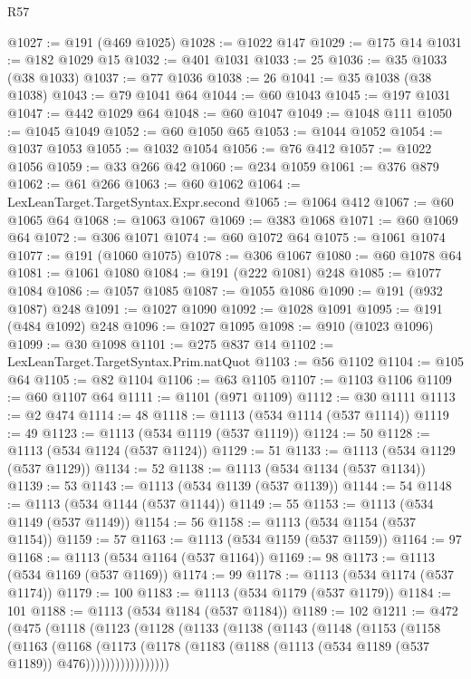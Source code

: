 \begin{lexlean}{R57}
\begin{coremodule}
@1027 := @191 (@469 @1025)
@1028 := @1022 @147
@1029 := @175 @14
@1031 := @182 @1029 @15
@1032 := @401 @1031
@1033 := 25
@1036 := @35 @1033 (@38 @1033)
@1037 := @77 @1036
@1038 := 26
@1041 := @35 @1038 (@38 @1038)
@1043 := @79 @1041 @64
@1044 := @60 @1043
@1045 := @197 @1031
@1047 := @442 @1029 @64
@1048 := @60 @1047
@1049 := @1048 @111
@1050 := @1045 @1049
@1052 := @60 @1050 @65
@1053 := @1044 @1052
@1054 := @1037 @1053
@1055 := @1032 @1054
@1056 := @76 @412
@1057 := @1022 @1056
@1059 := @33 @266 @42
@1060 := @234 @1059
@1061 := @376 @879
@1062 := @61 @266
@1063 := @60 @1062
@1064 := LexLeanTarget.TargetSyntax.Expr.second
@1065 := @1064 @412
@1067 := @60 @1065 @64
@1068 := @1063 @1067
@1069 := @383 @1068
@1071 := @60 @1069 @64
@1072 := @306 @1071
@1074 := @60 @1072 @64
@1075 := @1061 @1074
@1077 := @191 (@1060 @1075)
@1078 := @306 @1067
@1080 := @60 @1078 @64
@1081 := @1061 @1080
@1084 := @191 (@222 @1081) @248
@1085 := @1077 @1084
@1086 := @1057 @1085
@1087 := @1055 @1086
@1090 := @191 (@932 @1087) @248
@1091 := @1027 @1090
@1092 := @1028 @1091
@1095 := @191 (@484 @1092) @248
@1096 := @1027 @1095
@1098 := @910 (@1023 @1096)
@1099 := @30 @1098
@1101 := @275 @837 @14
@1102 := LexLeanTarget.TargetSyntax.Prim.natQuot
@1103 := @56 @1102
@1104 := @105 @64
@1105 := @82 @1104
@1106 := @63 @1105
@1107 := @1103 @1106
@1109 := @60 @1107 @64
@1111 := @1101 (@971 @1109)
@1112 := @30 @1111
@1113 := @2 @474
@1114 := 48
@1118 := @1113 (@534 @1114 (@537 @1114))
@1119 := 49
@1123 := @1113 (@534 @1119 (@537 @1119))
@1124 := 50
@1128 := @1113 (@534 @1124 (@537 @1124))
@1129 := 51
@1133 := @1113 (@534 @1129 (@537 @1129))
@1134 := 52
@1138 := @1113 (@534 @1134 (@537 @1134))
@1139 := 53
@1143 := @1113 (@534 @1139 (@537 @1139))
@1144 := 54
@1148 := @1113 (@534 @1144 (@537 @1144))
@1149 := 55
@1153 := @1113 (@534 @1149 (@537 @1149))
@1154 := 56
@1158 := @1113 (@534 @1154 (@537 @1154))
@1159 := 57
@1163 := @1113 (@534 @1159 (@537 @1159))
@1164 := 97
@1168 := @1113 (@534 @1164 (@537 @1164))
@1169 := 98
@1173 := @1113 (@534 @1169 (@537 @1169))
@1174 := 99
@1178 := @1113 (@534 @1174 (@537 @1174))
@1179 := 100
@1183 := @1113 (@534 @1179 (@537 @1179))
@1184 := 101
@1188 := @1113 (@534 @1184 (@537 @1184))
@1189 := 102
@1211 := @472
    (@475
      (@1118
        (@1123
          (@1128
            (@1133
              (@1138
                (@1143
                  (@1148
                    (@1153
                      (@1158
                        (@1163
                          (@1168
                            (@1173
                              (@1178
                                (@1183 (@1188 (@1113 (@534 @1189 (@537 @1189)) @476)))))))))))))))))

\end{coremodule}
\end{lexlean}
